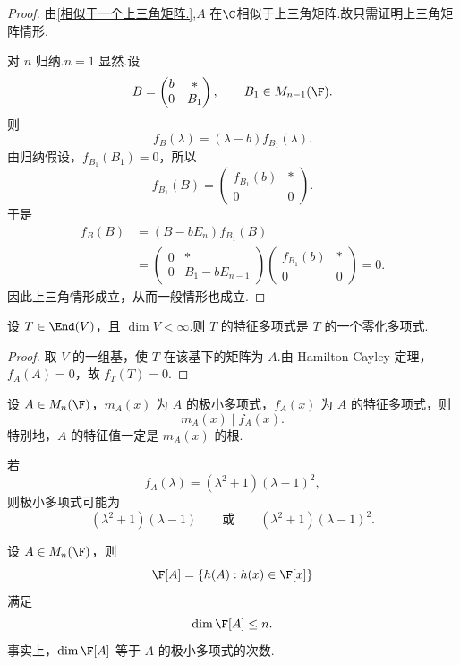 \begin{proof}
由\ref{相似于一个上三角矩阵.},$A$ 在$\C$相似于上三角矩阵.故只需证明上三角矩阵情形.

对 $n$ 归纳.$n=1$ 显然.设
\[
B=\begin{pmatrix}
b&*\\
0&B_1
\end{pmatrix},
\qquad B_1\in M_{n-1}(\F).
\]
则
\[
f_B(\lambda)=(\lambda-b)f_{B_1}(\lambda).
\]
由归纳假设，$f_{B_1}(B_1)=0$，所以
\[
f_{B_1}(B)=
\begin{pmatrix}
f_{B_1}(b)&*\\
0&0
\end{pmatrix}.
\]
于是
\[
\begin{aligned}
f_B(B)
&=(B-bE_n)f_{B_1}(B)\\
&=
\begin{pmatrix}
	0&*\\
	0&B_1-bE_{n-1}
\end{pmatrix}
\begin{pmatrix}
	f_{B_1}(b)&*\\
	0&0
\end{pmatrix}=0.
\end{aligned}
\]
因此上三角情形成立，从而一般情形也成立.
\end{proof}

\begin{proposition}
设 $T\in\End(V)$，且 $\dim V<\infty$.则 $T$ 的特征多项式是 $T$ 的一个零化多项式.
\end{proposition}

\begin{proof}
取 $V$ 的一组基，使 $T$ 在该基下的矩阵为 $A$.由 Hamilton-Cayley 定理，$f_A(A)=0$，故 $f_T(T)=0$.
\end{proof}

\begin{corollary}
设 $A\in M_n(\F)$，$m_A(x)$ 为 $A$ 的极小多项式，$f_A(x)$ 为 $A$ 的特征多项式，则
\[
m_A(x)\mid f_A(x).
\]
特别地，$A$ 的特征值一定是 $m_A(x)$ 的根.
\end{corollary}

\begin{example}
若
\[
f_A(\lambda)=(\lambda^2+1)(\lambda-1)^2,
\]
则极小多项式可能为
\[
(\lambda^2+1)(\lambda-1)
\qquad\text{或}\qquad
(\lambda^2+1)(\lambda-1)^2.
\]

\end{example}

\begin{example}
	
设 $A\in M_n(\F)$，则
\[
\F[A]=\{h(A):h(x)\in\F[x]\}
\]
满足
\[
\dim \F[A]\leq n.
\]
事实上，$\dim \F[A]$ 等于 $A$ 的极小多项式的次数.

\end{example}

